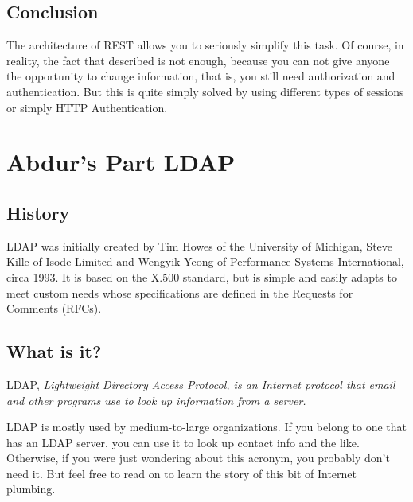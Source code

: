 \documentclass[12pt,a4paper]{report}
\begin{document}
	\section{Conclusion}
	The architecture of REST allows you to seriously simplify this task. Of course, in reality, the fact that described is not enough, because you can not give anyone the opportunity to change information, that is, you still need authorization and authentication. But this is quite simply solved by using different types of sessions or simply HTTP Authentication.
	
	
	
	
	\chapter{Abdur's Part LDAP}
	
	\section{History}

	LDAP was initially created by Tim Howes of the University of Michigan, Steve Kille of Isode Limited and Wengyik Yeong of Performance Systems International, circa 1993. It is based on the X.500 standard, but is simple and easily adapts to meet custom needs whose specifications are defined in the Requests for Comments (RFCs).\cite{LDAP}

	\section{What is it?}


	LDAP, \itshape Lightweight Directory Access Protocol\normalfont, is an Internet protocol that email and other programs use to look up information from a server.
	
	LDAP is mostly used by medium-to-large organizations. If you belong to one that has an LDAP server, you can use it to look up contact info and the like. Otherwise, if you were just wondering about this acronym, you probably don't need it. But feel free to read on to learn the story of this bit of Internet plumbing.
	
\end{document}
